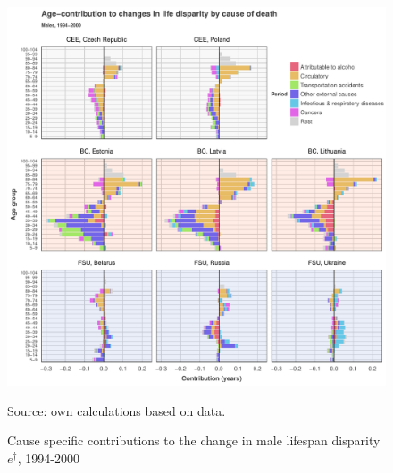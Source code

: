 \documentclass{article}
\begin{document}
\begin{figure}[h!]
\caption{Cause specific contributions to the change in  male lifespan disparity  $e^\dagger$, 1994-2000}
\label{Males_causes_1994}
\centering
\begin{center}
\includegraphics[scale=.70]{Figures/Cause_ed_decomp_Males_1.pdf}
\end{center}
Source: own calculations based on \citet{HcO} data. 
\end{figure}

\newpage
\end{document}
